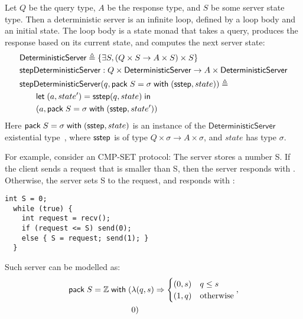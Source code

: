 \begin{definition}
  \label{def:qaserver}
Let $Q$ be the query type, $A$ be the response type, and $S$ be some server
state type.  Then a deterministic server is an infinite loop, defined by a loop
body and an initial state.  The loop body is a state monad that takes a query,
produces the response based on its current state, and computes the next server
state:
\begin{align*}
  &\mathsf{DeterministicServer}\triangleq\{\exists S,(Q \times S \to A \times S) \times S\} \\
  &\mathsf{stepDeterministicServer}:Q\times \mathsf{DeterministicServer} \to A\times \mathsf{DeterministicServer} \\
  &\mathsf{stepDeterministicServer}(q,\mathsf{pack}\;S=\sigma\;\mathsf{with}\;(\mathsf{sstep}, state))\triangleq\\
  &\qquad\mathsf{let}\;(a,state')=\mathsf{sstep}(q,state)\;\mathsf{in}\; \\
  &\qquad(a, \mathsf{pack}\;S=\sigma\;\mathsf{with}\;(\mathsf{sstep}, state'))
\end{align*}
Here $\mathsf{pack}\;S=\sigma\;\mathsf{with}\;(\mathsf{sstep}, state)$ is an instance of the
$\mathsf{DeterministicServer}$ existential type~\cite{tapl}, where $\mathsf{sstep}$ is
of type $Q\times\sigma\to A\times\sigma$, and $state$ has type $\sigma$.
\end{definition}

For example, consider an CMP-SET protocol: The server stores a number
\inlinec S.  If the client sends a request that is smaller than
\inlinec S, then the server responds with .  Otherwise, the
server sets \inlinec S to the request, and responds with :
\begin{lstlisting}[style=customc]
  int S = 0;
  while (true) {
    int request = recv();
    if (request <= S) send(0);
    else { S = request; send(1); }
  }
\end{lstlisting}

Such server can be modelled as:
\begin{align*}
  \mathsf{pack}\;S=\mathbb Z\;\mathsf{with}\;(&\lambda(q,s)\Rightarrow\begin{cases}
        (0,s)&q\le s\\
        (1,q)&\mathrm{otherwise}
    \end{cases},\\
    &0)
\end{align*}

